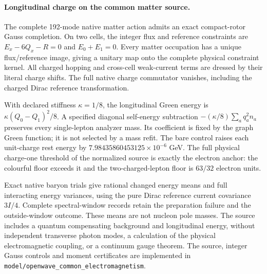 \paragraph{Longitudinal charge on the common matter source.}
The complete 192-mode native matter action admits an exact compact-rotor
Gauss completion. On two cells, the integer flux and reference constraints
are $E_x-6Q_x-R=0$ and $E_0+E_1=0$. Every matter occupation has a unique
flux/reference image, giving a unitary map onto the complete physical
constraint kernel. All charged hopping and cross-cell weak-current terms
are dressed by their literal charge shifts. The full native charge
commutator vanishes, including the charged Dirac reference transformation.

With declared stiffness $\kappa=1/8$, the longitudinal Green energy is
$\kappa(Q_0-Q_1)^2/8$. A specified diagonal self-energy subtraction
$-(\kappa/8)\sum_aq_a^2n_a$ preserves every single-lepton analyzer mass.
Its coefficient is fixed by the graph Green function; it is not selected
by a mass refit. The bare control raises each unit-charge rest energy by
$7.98435860453125\times10^{-6}$ GeV. The full physical charge-one threshold
of the normalized source is exactly the electron anchor: the colourful
floor exceeds it and the two-charged-lepton floor is $63/32$ electron units.

Exact native baryon trials give rational changed energy means and
full interacting energy variances, using the pure Dirac reference current
covariance $3I/4$. Complete spectral-window records retain the preparation
failure and the outside-window outcome. These means are not nucleon pole
masses. The source includes a quantum compensating background and
longitudinal energy, without independent transverse photon modes, a
calculation of the physical electromagnetic coupling, or a continuum gauge
theorem. The source, integer Gauss controls and moment certificates are
implemented in \texttt{model/openwave\_common\_electromagnetism}.
